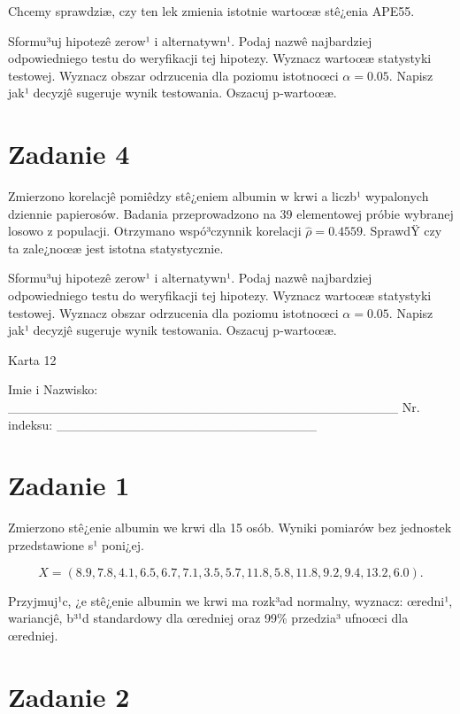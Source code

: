 \documentclass[a4paper,12pt]{article}
\begin{document}
  Chcemy sprawdziæ, czy ten lek zmienia istotnie wartoœæ stê¿enia APE55.
  
  Sformu³uj hipotezê zerow¹ i alternatywn¹. 
  Podaj nazwê najbardziej odpowiedniego testu do weryfikacji tej hipotezy. 
  Wyznacz wartoœæ statystyki testowej. 
  Wyznacz obszar odrzucenia dla poziomu istotnoœci $\alpha=0.05$. 
  Napisz jak¹ decyzjê sugeruje wynik testowania. Oszacuj p-wartoœæ. \vspace{1cm} 

  \section*{Zadanie 4}
     
     Zmierzono korelacjê pomiêdzy stê¿eniem albumin w krwi a liczb¹ wypalonych dziennie papierosów. 
     Badania przeprowadzono na 39 elementowej próbie wybranej losowo z populacji. 
     Otrzymano wspó³czynnik korelacji $\hat\rho = 0.4559 $. 
     SprawdŸ czy ta zale¿noœæ jest istotna statystycznie. 
     
     Sformu³uj hipotezê zerow¹ i alternatywn¹. 
     Podaj nazwê najbardziej odpowiedniego testu do weryfikacji tej hipotezy. 
     Wyznacz wartoœæ statystyki testowej. 
     Wyznacz obszar odrzucenia dla poziomu istotnoœci $\alpha=0.05$. 
     Napisz jak¹ decyzjê sugeruje wynik testowania. 
     Oszacuj p-wartoœæ. \vspace{1cm} 

  \clearpage  Karta  12  

 Imie i Nazwisko: \_\_\_\_\_\_\_\_\_\_\_\_\_\_\_\_\_\_\_\_\_\_\_\_\_\_\_\_\_\_\_\_\_\_\_\_\_\_\_\_\_\_ Nr. indeksu: \_\_\_\_\_\_\_\_\_\_\_\_\_\_\_\_\_\_\_\_\_\_\_\_\_\_\_\_ 
 \section*{Zadanie 1}
     
     Zmierzono stê¿enie albumin we krwi dla 15 osób. 
     Wyniki pomiarów bez jednostek przedstawione s¹ poni¿ej. 
     
     \noindent $$X=(  8.9,  7.8,  4.1,  6.5,  6.7,  7.1,  3.5,  5.7, 11.8,  5.8, 11.8,  9.2,  9.4, 13.2,  6.0 ).$$
     
     Przyjmuj¹c, ¿e stê¿enie albumin we krwi ma rozk³ad normalny, 
     wyznacz: œredni¹, wariancjê, b³¹d standardowy dla œredniej oraz 99\% przedzia³ ufnoœci dla œredniej. \vspace{1cm} 

  \section*{Zadanie 2}
     
\end{document}
